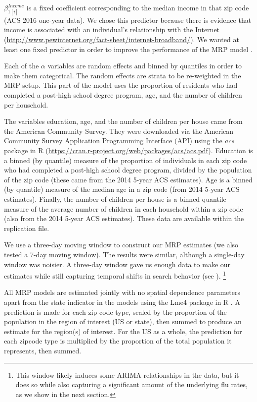 \documentclass[12pt]{article}
\begin{document}
$\beta_{1[i]}^{Income}$ is a fixed coefficient corresponding to the median income in that zip code (ACS 2016 one-year data). We chose this predictor because there is evidence that income is associated with an individual's relationship with the Internet (\url{http://www.pewinternet.org/fact-sheet/internet-broadband/}). We wanted at least one fixed predictor in order to improve the performance of the MRP model \citep{buttice_and_highton_2013}.

Each of the $\alpha$ variables are random effects and binned by quantiles in order to make them categorical. The random effects are strata to be re-weighted in the MRP setup. This part of the model uses the proportion of residents who had completed a post-high school degree program, age, and the number of children per household.

The variables education, age, and the number of children per house came from the American Community Survey. They were downloaded via the American Community Survey Application Programming Interface (API) using the \emph{acs} package in R (\url{https://cran.r-project.org/web/packages/acs/acs.pdf}). Education is a binned (by quantile) measure of the proportion of individuals in each zip code who had completed a post-high school degree program, divided by the population of the zip code (these came from the 2014 5-year ACS estimates). Age is a binned (by quantile) measure of the median age in a zip code (from 2014 5-year ACS estimates). Finally, the number of children per house is a binned quantile measure of the average number of children in each household within a zip code (also from the 2014 5-year ACS estimates). These data are available within the replication file. 

We use a three-day moving window to construct our MRP estimates (we also tested a 7-day moving window). The results were similar, although a single-day window was noisier. A three-day window gave us enough data to make our estimates while still capturing temporal shifts in search behavior (see \citet{yang_etal_2015inference}). \footnote{This window likely induces some ARIMA relationships in the data, but it does so while also capturing a significant amount of the underlying flu rates, as we show in the next section.} 

All MRP models are estimated jointly with no spatial dependence parameters apart from the state indicator in the models using the Lme4 package in R \citep{bates_etal_2015}. A prediction is made for each zip code type, scaled by the proportion of the population in the region of interest (US or state), then summed to produce an estimate for the region(s) of interest. For the US as a whole, the prediction for each zipcode type is multiplied by the proportion of the total population it represents, then summed. 
\end{document}
